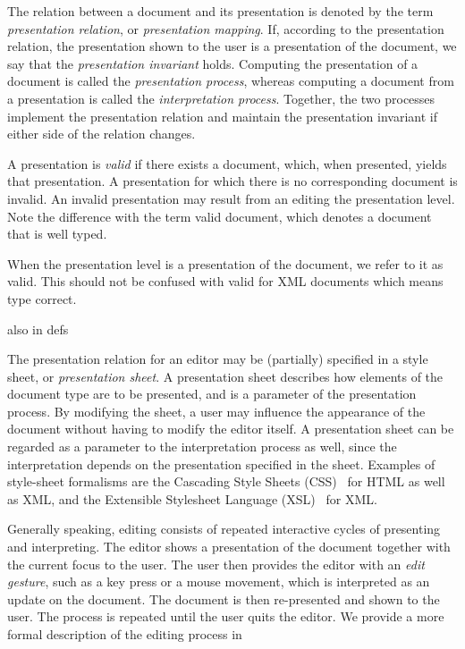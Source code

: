 \documentclass{speauth}
\begin{document}
The relation between a document and its presentation is denoted by the term {\em presentation relation}, or {\em presentation mapping}. If, according to the presentation relation, the presentation shown to the user is a presentation of the document, we say that the {\em presentation invariant} holds. Computing the presentation of a document is called the {\em presentation process}, whereas computing a document from a presentation is called the {\em interpretation process}. Together, the two processes implement the presentation relation and maintain the presentation invariant if either side of the relation changes.

A presentation is {\em valid} if there exists a document, which, when presented, yields that presentation. A presentation for which there is no corresponding document is invalid. An invalid presentation may result from an editing the presentation level. Note the difference with the term valid document, which denotes a document that is well typed.

\bc

When the presentation level is a presentation of the document, we refer to it as valid. This should not be confused with valid for XML documents which means type correct.

also in defs

\ec

The presentation relation for an editor may be (partially) specified in a style sheet, or {\em presentation sheet}. A presentation sheet describes how elements of the document type are to be presented, and is a parameter of the presentation process. By modifying the sheet, a user may influence the appearance of the document without having to modify the editor itself. A presentation sheet can be regarded as a parameter to the interpretation process as well, since the interpretation depends on the presentation specified in the sheet. Examples of style-sheet formalisms are the Cascading Style Sheets (CSS)~\cite{css2} for HTML as well as XML, and the Extensible Stylesheet Language (XSL)~\cite{xsl10} for XML.

Generally speaking, editing consists of repeated interactive cycles of presenting and interpreting. The editor shows a presentation of the document together with the current focus to the user. The user then provides the editor with an {\em edit gesture}, such as a key press or a mouse movement, which is interpreted as an update on the document. The document is then re-presented and shown to the user. The process is repeated until the user quits the editor. We provide a more formal description of the editing process in
\end{document}
